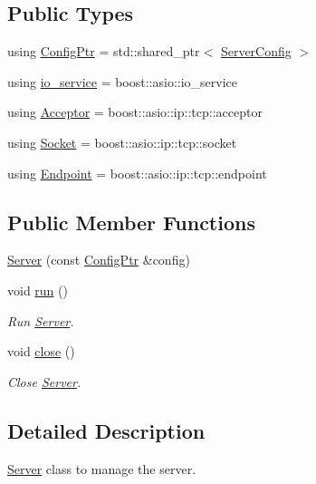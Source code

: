 \subsection*{Public Types}
\begin{DoxyCompactItemize}
\item 
using \hyperlink{class_zia_1_1_server_a10861064c5ac1dc97cc537023d67471d}{Config\+Ptr} = std\+::shared\+\_\+ptr$<$ \hyperlink{class_zia_1_1_server_config}{Server\+Config} $>$
\item 
using \hyperlink{class_zia_1_1_server_a624c715504f8bbf6b858081dabe26f9c}{io\+\_\+service} = boost\+::asio\+::io\+\_\+service
\item 
using \hyperlink{class_zia_1_1_server_a0119259e0eaa12e4f688c6c64dbf6ac0}{Acceptor} = boost\+::asio\+::ip\+::tcp\+::acceptor
\item 
using \hyperlink{class_zia_1_1_server_ae3a52a854f930c1daa7c8e510f7e37bd}{Socket} = boost\+::asio\+::ip\+::tcp\+::socket
\item 
using \hyperlink{class_zia_1_1_server_a4764ec255c11f5b7fb87f5ab1d44e952}{Endpoint} = boost\+::asio\+::ip\+::tcp\+::endpoint
\end{DoxyCompactItemize}
\subsection*{Public Member Functions}
\begin{DoxyCompactItemize}
\item 
\hyperlink{class_zia_1_1_server_a3f1591f28c6755b353d61e3a44d56b39}{Server} (const \hyperlink{class_zia_1_1_server_a10861064c5ac1dc97cc537023d67471d}{Config\+Ptr} \&config)
\item 
void \hyperlink{class_zia_1_1_server_abb27d30b40a94326e3fd629d3b30b7d5}{run} ()
\begin{DoxyCompactList}\small\item\em Run \hyperlink{class_zia_1_1_server}{Server}. \end{DoxyCompactList}\item 
void \hyperlink{class_zia_1_1_server_ad1a4b1650214d156491a98ff6b96d787}{close} ()
\begin{DoxyCompactList}\small\item\em Close \hyperlink{class_zia_1_1_server}{Server}. \end{DoxyCompactList}\end{DoxyCompactItemize}


\subsection{Detailed Description}
\hyperlink{class_zia_1_1_server}{Server} class to manage the server. 

